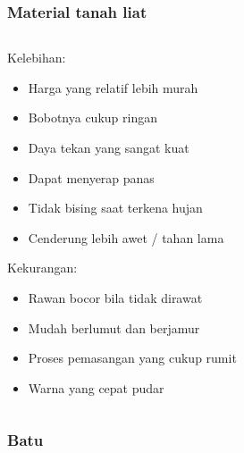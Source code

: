 \documentclass[../main.tex]{subfiles}
\begin{document}
\begin{frame}[t,mybg=,mycolor=digiPH_leaf,mytitle=standard,dark]
	\frametitle{Material tanah liat}
	\begin{columns}
		\begin{column}{0.5\textwidth}

			Kelebihan:
			\begin{itemize}
				\item<1-> Harga yang relatif lebih murah
				\item<1-> Bobotnya cukup ringan
				\item<2-> Daya tekan yang sangat kuat
				\item<2-> Dapat menyerap panas
				\item<3-> Tidak bising saat terkena hujan
				\item<3-> Cenderung lebih awet / tahan lama
			\end{itemize}

			Kekurangan:
			\begin{itemize}
				\item<4-> Rawan bocor bila tidak dirawat
				\item<4-> Mudah berlumut dan berjamur
				\item<5-> Proses pemasangan yang cukup rumit
				\item<5-> Warna yang cepat pudar
			\end{itemize}


		\end{column}
		\begin{column}{0.5\textwidth}
		\end{column}
	\end{columns}

\end{frame}

\begin{frame}[label=current,t,mybg=39-nq6i,mytitle=standard,light]
	\frametitle{Batu}


\end{frame}
\end{document}
